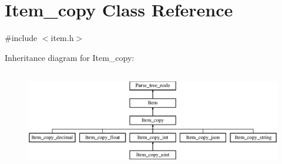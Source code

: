 \hypertarget{classItem__copy}{}\section{Item\+\_\+copy Class Reference}
\label{classItem__copy}


{\ttfamily \#include $<$item.\+h$>$}

Inheritance diagram for Item\+\_\+copy\+:\begin{figure}[H]
\begin{center}
\leavevmode
\includegraphics[height=4.409449cm]{classItem__copy}
\end{center}
\end{figure}
